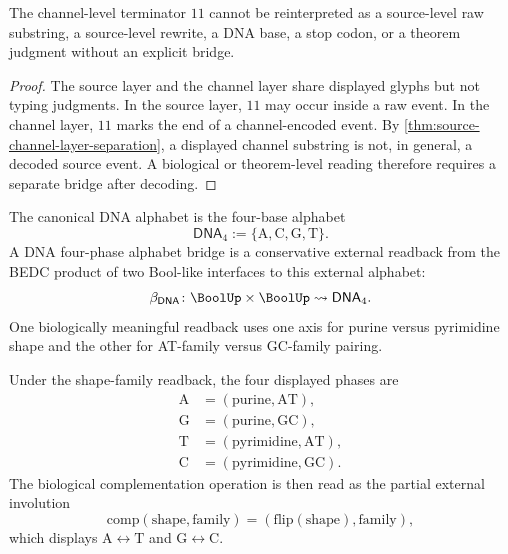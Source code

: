 \begin{theorem}
\label{thm:philosophy-channel-source-layer-separation}
The channel-level terminator $11$ cannot be reinterpreted as a
source-level raw substring, a source-level rewrite, a DNA base, a stop
codon, or a theorem judgment without an explicit bridge.
\end{theorem}
\begin{proof}
The source layer and the channel layer share displayed glyphs but not
typing judgments. In the source layer, $11$ may occur inside a raw
event. In the channel layer, $11$ marks the end of a channel-encoded
event. By \autoref{thm:source-channel-layer-separation}, a displayed
channel substring is not, in general, a decoded source event. A
biological or theorem-level reading therefore requires a separate
bridge after decoding.
\end{proof}

\begin{definition}
\label{def:philosophy-dna-four-phase-alphabet-bridge}
The canonical DNA alphabet is the four-base alphabet
$$
  \mathsf{DNA}_{4}:=\{\mathrm{A},\mathrm{C},\mathrm{G},\mathrm{T}\}.
$$
A DNA four-phase alphabet bridge is a conservative external readback
from the BEDC product of two Bool-like interfaces to this external
alphabet:
$$
  \beta_{\mathsf{DNA}}
  \colon
  \BoolUp\times\BoolUp
  \rightsquigarrow
  \mathsf{DNA}_{4}.
$$
One biologically meaningful readback uses one axis for purine versus
pyrimidine shape and the other for AT-family versus GC-family pairing.
\end{definition}

\begin{definition}
\label{def:philosophy-dna-complementation-readback}
Under the shape-family readback, the four displayed phases are
$$
\begin{aligned}
  \mathrm{A} &= (\mathrm{purine},\mathrm{AT}),\\
  \mathrm{G} &= (\mathrm{purine},\mathrm{GC}),\\
  \mathrm{T} &= (\mathrm{pyrimidine},\mathrm{AT}),\\
  \mathrm{C} &= (\mathrm{pyrimidine},\mathrm{GC}).
\end{aligned}
$$
The biological complementation operation is then read as the partial
external involution
$$
  \mathrm{comp}(\mathrm{shape},\mathrm{family})
  =
  (\mathrm{flip}(\mathrm{shape}),\mathrm{family}),
$$
which displays $\mathrm{A}\leftrightarrow\mathrm{T}$ and
$\mathrm{G}\leftrightarrow\mathrm{C}$.
\end{definition}

